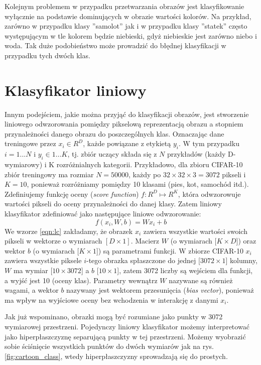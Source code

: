 Kolejnym problemem w przypadku przetwarzania obrazów jest klasyfikowanie wyłącznie na podstawie dominujących w obrazie wartości kolorów.
Na przykład, zarówno w przypadku klasy ''samolot'' jak i w przypadku klasy ''statek'' często występującym w tle kolorem będzie niebieski, gdyż niebieskie jest zarówno niebo i woda.
Tak duże podobieństwo może prowadzić do błędnej klasyfikacji w przypadku tych dwóch klas. \cite{cs231n}

\section{Klasyfikator liniowy}\label{sec:linear_classifier}

Innym podejściem, jakie można przyjąć do klasyfikacji obrazów, jest stworzenie liniowego odwzorowania pomiędzy pikselową reprezentacją obrazu a stopniem przynależności danego obrazu do poszczególnych klas.
Oznaczając dane treningowe przez $x_i \in R^D$, każde powiązane z etykietą $y_i$.
W tym przypadku $i = 1 ... N$ i $y_i \in 1 ... K$, tj. zbiór uczący składa się z $N$ przykładów (każdy D-wymiarowy) i K rozróżnialnych kategorii.
Przykładowo, dla zbioru CIFAR-10 zbiór treningowy ma rozmiar $N = 50000$, każdy po $32 \times 32 \times 3 = 3072$ pikseli i $K = 10$, ponieważ rozróżniamy pomiędzy 10 klasami (pies, kot, samochód itd.).
Zdefiniujemy funkcję oceny (\textit{score function}) $f : R^D \mapsto R^K$, która odwzorowuje wartości pikseli do oceny przynależności do danej klasy.
Zatem liniowy klasyfikator zdefiniować jako następujące liniowe odwzorowanie:
\begin{equation}\label{eqn:lc}
f(x_i,W,b) = Wx_i + b
\end{equation}
We wzorze \ref{eqn:lc} zakładamy, że obrazek $x_i$ zawiera wszystkie wartości swoich pikseli w wektorze o wymiarach $[D \times 1]$.
Macierz $W$ (o wymiarach $[K \times D$]) oraz wektor $b$ (o wymiarach [$K \times 1$]) są parametrami funkcji.
W zbiorze CIFAR-10 $x_i$ zawiera wszystkie piksele $i$-tego obrazka spłaszczone do jednej [$3072 \times 1$] kolumny, $W$ ma wymiar [$10 \times 3072$] a $b$ [$10 \times 1$], zatem 3072 liczby są wejściem dla funkcji, a wyjść jest 10 (oceny klas).
Parametry wewnątrz $W$ nazywane są również wagami, a wektor $b$ nazywany jest wektorem przesunięcia (\textit{bias vector}), ponieważ ma wpływ na wyjściowe oceny bez wchodzenia w interakcję z danymi $x_i$. \cite{cs231n}

Jak już wspominano, obrazki mogą być rozumiane jako punkty w 3072 wymiarowej przestrzeni.
Pojedynczy liniowy klasyfikator możemy interpretować jako hiperpłaszczyznę separującą punkty w tej przestrzeni.
Możemy wyobrazić sobie ściśnięcie wszystkich punktów do dwóch wymiarów jak na rys. \ref{fig:cartoon_class}, wtedy hiperpłaszczyzny sprowadzają się do prostych.

